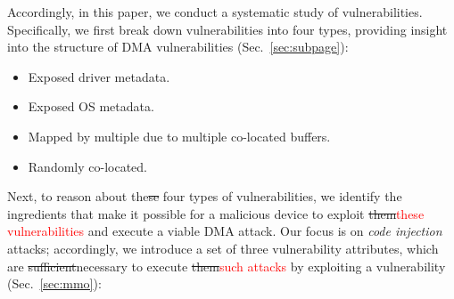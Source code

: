 
Accordingly, in this paper, we conduct a systematic study of \subpage{} vulnerabilities. Specifically, we first break down \subpage{} vulnerabilities into four types, providing insight into the structure of DMA vulnerabilities (Sec.~\ref{sec:subpage}):
\begin{itemize}
    \item Exposed driver metadata.
    \item Exposed OS metadata. 
    \item Mapped by multiple \iova due to multiple co-located buffers.
    \item Randomly co-located.
\end{itemize}


Next, to reason about the\sout{se} four types of \subpage{} vulnerabilities, we identify the ingredients that make it possible for a malicious device to exploit \sout{them}\textcolor{red}{these vulnerabilities} and execute a viable DMA attack.
Our focus is on \emph{code injection} attacks; accordingly, we introduce a set of three vulnerability attributes, which are \sout{sufficient}necessary to execute \sout{them}\textcolor{red}{such attacks} by exploiting a \subpage{} vulnerability (Sec.~\ref{sec:mmo}):

